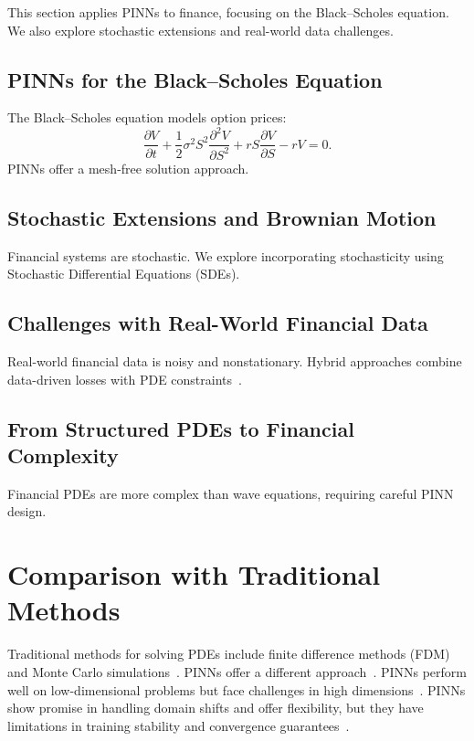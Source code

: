 \documentclass[12pt,a4paper]{article}
\begin{document}
This section applies PINNs to finance, focusing on the Black–Scholes equation. We also explore stochastic extensions and real-world data challenges.

\subsection{PINNs for the Black–Scholes Equation}

The Black–Scholes equation models option prices:
\[
\frac{\partial V}{\partial t} + \frac{1}{2}\sigma^2 S^2 \frac{\partial^2 V}{\partial S^2} + r S \frac{\partial V}{\partial S} - r V = 0.
\]
PINNs offer a mesh-free solution approach.

\subsection{Stochastic Extensions and Brownian Motion}

Financial systems are stochastic. We explore incorporating stochasticity using Stochastic Differential Equations (SDEs).

\subsection{Challenges with Real-World Financial Data}

Real-world financial data is noisy and nonstationary. Hybrid approaches combine data-driven losses with PDE constraints~\cite{wight2020solving, finlay2022train}.

\subsection{From Structured PDEs to Financial Complexity}

Financial PDEs are more complex than wave equations, requiring careful PINN design.

\section{Comparison with Traditional Methods}

Traditional methods for solving PDEs include finite difference methods (FDM) and Monte Carlo simulations~\cite{leveque2007finite, morton2005numerical}. PINNs offer a different approach~\cite{raissi2019physics, karniadakis2021physics}. PINNs perform well on low-dimensional problems but face challenges in high dimensions~\cite{wang2022understanding}. PINNs show promise in handling domain shifts and offer flexibility, but they have limitations in training stability and convergence guarantees~\cite{mishra2022estimates}.
\end{document}
